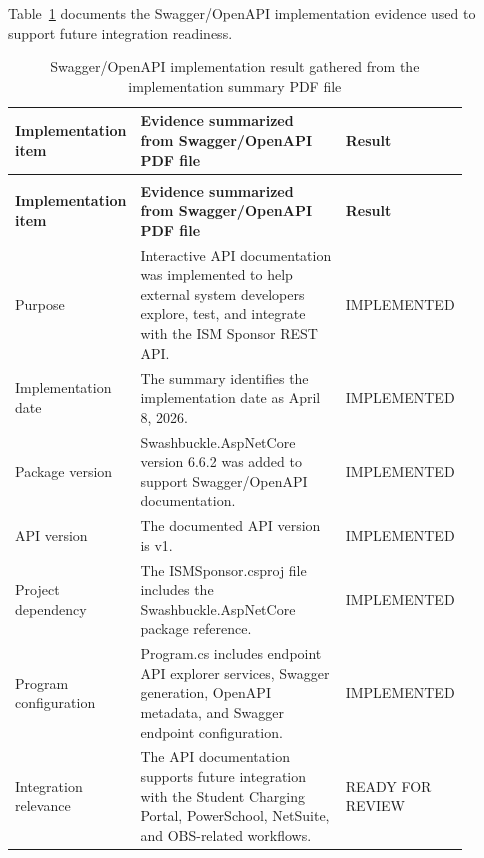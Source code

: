 {\footnotesize
Table~\ref{table:appendix-swagger-result} documents the Swagger/OpenAPI implementation evidence used to support future integration readiness.

\begin{longtable}{|>{\raggedright\arraybackslash}p{0.26\linewidth}|>{\raggedright\arraybackslash}p{0.46\linewidth}|>{\centering\arraybackslash}p{0.18\linewidth}|}
\hline
\textbf{Implementation item} & \textbf{Evidence summarized from Swagger/OpenAPI PDF file} & \textbf{Result} \\
\hline
\endfirsthead
\multicolumn{3}{c}{\textbf{A.6: Swagger/OpenAPI Implementation Result (continued)}}\\
\hline
\textbf{Implementation item} & \textbf{Evidence summarized from Swagger/OpenAPI PDF file} & \textbf{Result} \\
\hline
\endhead
\hline
\caption{Swagger/OpenAPI implementation result gathered from the implementation summary PDF file}\label{table:appendix-swagger-result}
\endlastfoot
Purpose & Interactive API documentation was implemented to help external system developers explore, test, and integrate with the ISM Sponsor REST API. & IMPLEMENTED \\
\hline
Implementation date & The summary identifies the implementation date as April 8, 2026. & IMPLEMENTED \\
\hline
Package version & Swashbuckle.AspNetCore version 6.6.2 was added to support Swagger/OpenAPI documentation. & IMPLEMENTED \\
\hline
API version & The documented API version is v1. & IMPLEMENTED \\
\hline
Project dependency & The ISMSponsor.csproj file includes the Swashbuckle.AspNetCore package reference. & IMPLEMENTED \\
\hline
Program configuration & Program.cs includes endpoint API explorer services, Swagger generation, OpenAPI metadata, and Swagger endpoint configuration. & IMPLEMENTED \\
\hline
Integration relevance & The API documentation supports future integration with the Student Charging Portal, PowerSchool, NetSuite, and OBS-related workflows. & READY FOR REVIEW \\
\hline
\end{longtable}
}
